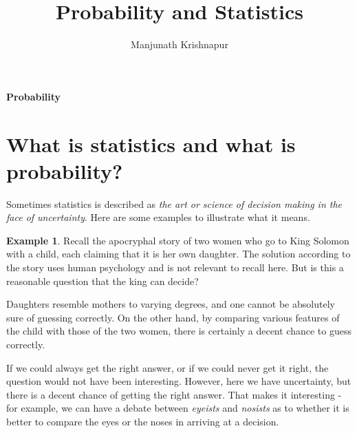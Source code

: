 \documentclass[preprint,  11pt]{amsart}
\theoremstyle{plain} %
\theoremstyle{definition} %
\newtheorem{example}[theorem]{Example}
\begin{document}
\title{Probability and Statistics}
\author{Manjunath Krishnapur}

\maketitle

 \tableofcontents

\newpage

\maketitle

\setcounter{page}{4}



\newpage
\vspace*{\fill}
\begin{center}
\Huge {\bf Probability}
\end{center}
\vspace*{\fill}
\newpage

\section{What is statistics and what is probability?}
Sometimes statistics is described as {\em the art or science of decision making in the face of uncertainty}.  Here are some examples to illustrate what it means.
\begin{example} Recall the apocryphal story of two women who go to King Solomon with a child, each claiming that it is her own daughter. The solution according to the story uses human psychology and is not relevant to recall here. But is this a reasonable question that the king can decide? 

Daughters resemble mothers to varying degrees, and one cannot be absolutely sure of guessing correctly.  
 On the other hand, by comparing various features of the child with those of the two women, there is certainly a decent chance to guess correctly.
   
  If we could always get the right answer, or if we could never get it right, the question would not have been interesting. However, here we have uncertainty, but there is a decent chance of getting the right answer. That makes it interesting - for example, we can have a debate between {\em eyeists}  and {\em nosists} as to whether it is better to compare the eyes or the noses in arriving at a decision.
\end{example}
\end{document}
